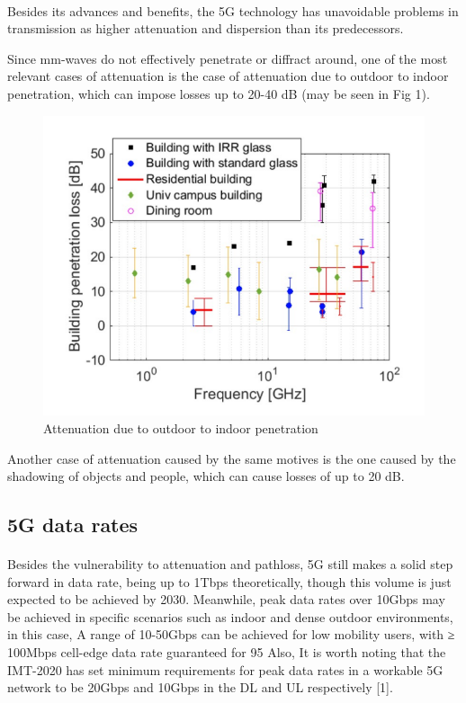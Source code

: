 \documentclass[10pt,journal,compsoc]{IEEEtran}
\begin{document}
\paragraph{}
Besides its advances and benefits, the 5G technology has unavoidable problems in transmission as higher attenuation and dispersion than its predecessors.\par
Since mm-waves do not effectively penetrate or diffract around, one of the most relevant cases of attenuation is the case of attenuation due to outdoor to indoor penetration, which can impose losses up to 20-40 dB (may be seen in Fig 1).\par
\begin{figure}[h]
\centering
\includegraphics[width=\textwidth]{Fig1}
\caption{Attenuation due to outdoor to indoor penetration}
\end{figure}
Another case of attenuation caused by the same motives is the one caused by the shadowing of objects and people, which can cause losses of up to 20 dB.\par
\subsection*{5G data rates}
\paragraph{}
Besides the vulnerability to attenuation and pathloss, 5G still makes a solid step forward in data rate, being up to 1Tbps theoretically, though this volume is just expected to be achieved by 2030. Meanwhile, peak data rates over 10Gbps may be achieved in specific scenarios such as indoor and dense outdoor environments, in this case, A range of 10-50Gbps can be achieved for low mobility users, with ≥ 100Mbps cell-edge data rate guaranteed for 95%
Also, It is worth noting that the IMT-2020 has set minimum requirements for peak data rates in a workable 5G network to be 20Gbps and 10Gbps in the DL and UL respectively [1].\par
\end{document}
